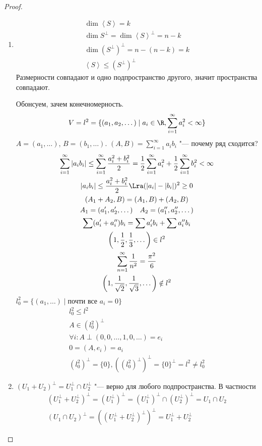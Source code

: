 \begin{proof}
\begin{enumerate}
	\item
		\begin{gather*}
			\dim \left<S\right> = k \\
			\dim S^\bot = \dim \left<S\right>^\bot = n - k \\
			\dim (S^\bot)^\bot = n - (n - k) = k \\
			\left<S\right> \le (S^\bot)^\bot
		\end{gather*}
		Размерности совпадают и одно подпространство другого, значит пространства совпадают.

		\begin{exmp}
			Обонсуем, зачем конечномерность.
			\[ V = l^2 = \{(a_1, a_2, \dots) \mid a_i \in \R, \sum_{i=1}^\infty a_i^2 < \infty\} \]
			$A = (a_1, \dots)$, $B = (b_1, \dots)$.
			$(A, B) = \sum_{i = 1}^\infty a_i b_i$ "--- почему ряд сходится?
			\begin{gather*}
				\sum_{i=1}^\infty |a_i b_i|
				\le \sum_{i=1}^\infty \frac{a_i^2 + b_i^2}2 = \frac12 \sum_{i = 1}^\infty a_i^2 + \frac12\sum_{i = 1}^\infty b_i^2 < \infty \\
				|a_i b_i| \le \frac{a_i^2 + b_i^2}2 \Lra (|a_i| - |b_i|)^2 \ge 0 \\
				(A_1 + A_2, B) = (A_1, B) + (A_2, B) \\
				A_1 = (a_1', a_2', \dots) \quad A_2 = (a_1'', a_2'', \dots) \\
				\sum(a_i' + a_i'')b_i = \sum a_i'b_i + \sum a_i''b_i \\
				\left(1, \frac12, \frac13, \dots\right) \in l^2 \\
				\sum_{n = 1}^\infty \frac1{n^2} = \frac{\pi^2}6 \\
				\left(1, \frac1{\sqrt{2}}, \frac1{\sqrt{3}}, \dots\right) \notin l^2
			\end{gather*}
			$l^2_0 = \{(a_1, \dots) \mid \text{почти все $a_i = 0$}\}$
			\begin{gather*}
				l_0^2 \le l^2 \\
				A \in (l_0^2)^\bot \\
				\forall i \colon A \perp (0, 0, \dots, 1, 0, \dots) = e_i \\
				0 = (A, e_i) = a_i \\
				(l_0^2)^\bot = \{0\}, ((l_0^2)^\bot)^\bot = \{0\}^\bot = l^2 \ne l_0^2
			\end{gather*}
		\end{exmp}

	\item
		$(U_1 + U_2)^\bot = U_1^\bot \cap U_2^\bot$  "--- верно для любого подпространства.
		В частности
		\begin{gather*}
			(U_1^\bot + U_2^\bot)^\bot = (U_1^\bot)^\bot = (U_1^\bot)^\bot \cap (U_2^\bot)^\bot = U_1 \cap U_2 \\
			(U_1 \cap U_2)^\bot = ((U_1^\bot + U_2^\bot)^\bot)^\bot = U_1^\bot + U_2^\bot
		\end{gather*}
	\end{enumerate}
\end{proof}
